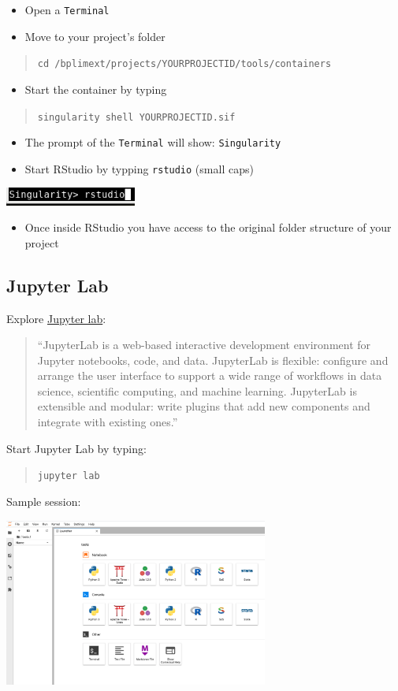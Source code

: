 \documentclass[
  11pt,
  a4paper,
]{article}
\providecommand{\tightlist}{%
  \setlength{\itemsep}{0pt}\setlength{\parskip}{0pt}}
\begin{document}
\begin{itemize}
\item
  Open a \texttt{Terminal}
\item
  Move to your project's folder
\end{itemize}

\begin{quote}
\texttt{cd\ /bplimext/projects/YOURPROJECTID/tools/containers}
\end{quote}

\begin{itemize}
\tightlist
\item
  Start the container by typing
\end{itemize}

\begin{quote}
\texttt{singularity\ shell\ YOURPROJECTID.sif}
\end{quote}

\begin{itemize}
\item
  The prompt of the \texttt{Terminal} will show: \texttt{Singularity}
\item
  Start RStudio by typping \texttt{rstudio} (small caps)
\end{itemize}

\includegraphics[width=1.7in,height=\textheight]{media/Singularity_Terminal_Prompt.png}

\begin{itemize}
\tightlist
\item
  Once inside RStudio you have access to the original folder structure
  of your project
\end{itemize}

\hypertarget{jupyter-lab}{%
\subsection{Jupyter Lab}\label{jupyter-lab}}

Explore \href{https://jupyter.org/}{Jupyter lab}:

\begin{quote}
``JupyterLab is a web-based interactive development environment for
Jupyter notebooks, code, and data. JupyterLab is flexible: configure and
arrange the user interface to support a wide range of workflows in data
science, scientific computing, and machine learning. JupyterLab is
extensible and modular: write plugins that add new components and
integrate with existing ones.''
\end{quote}

Start Jupyter Lab by typing:

\begin{quote}
\texttt{jupyter\ lab}
\end{quote}

Sample session:

\includegraphics[width=0.65\textwidth,height=\textheight]{./media/JupyterLab.png}
\end{document}
